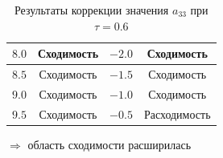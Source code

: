 \documentclass[../body.tex]{subfiles}
\begin{document}
\begin{table}[H]
\begin{tabular}{|c|c|c|c|}
				\hline
				$8.0$ & Сходимость & $-2.0$ & Сходимость \\
				
				\hline
				$8.5$ & Сходимость & $-1.5$ & Сходимость \\
				
				\hline
				$9.0$ & Сходимость & $-1.0$ & Сходимость \\
				
				\hline
				$9.5$ & Сходимость & $-0.5$ & Расходимость \\

				\hline
				
			\end{tabular}
			\caption{Результаты коррекции значения $a_{33}$ при $\tau=0.6$}
		\end{table}  $\Longrightarrow$ область сходимости расширилась
\end{document}
